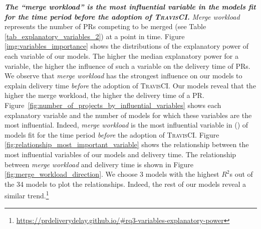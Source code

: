 \textit{\textbf{The ``merge workload'' is the most influential variable in the
	models fit for the time period \textit{before} the adoption of \textsc{TravisCI}.}} \textit{Merge
workload} represents the number of PRs competing to be merged (see Table
\ref{tab_explanatory_variables_2}) at a point in time. Figure \ref{img:variables_importance} shows
the distributions of the explanatory power of each variable of our
models. The higher the median explanatory power for a variable, the
higher the influence of such a variable on the delivery time of PRs. We
observe that \textit{merge workload} has the strongest influence on our models to
explain delivery time {\em before} the adoption of \textsc{TravisCI}. Our models reveal that the
higher the merge workload, the higher the delivery time of 
a PR. Figure~\ref{fig:number_of_projects_by_influential_variables} shows each
explanatory variable and the number of models for which these variables are the
most influential. Indeed, \textit{merge workload} is the most influential
variable in () of models fit for the time period
\textit{before} the adoption of \textsc{TravisCI}. Figure \ref{fig:relationship_most_important_variable}
shows the relationship between the most influential variables of our models and
delivery time. The relationship between \textit{merge workload} and
delivery time is shown in Figure \ref{fig:merge_workload_direction}. We choose
3 models with the highest $R^2$s out of the 34 models to plot the relationships.
Indeed, the rest of our models reveal a similar
trend.\footnote{\url{https://prdeliverydelay.github.io/\#rq3-variables-explanatory-power}}

